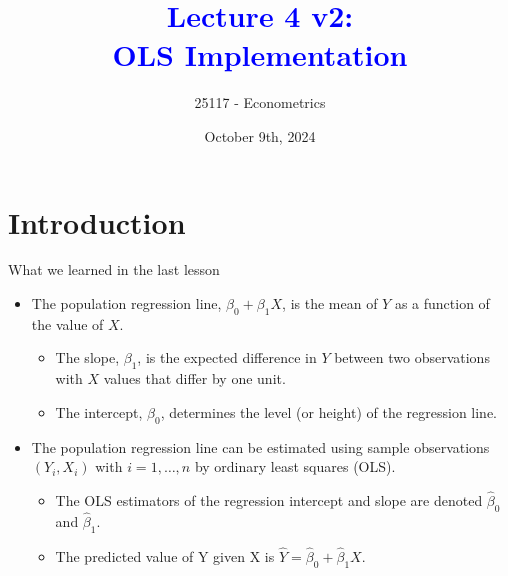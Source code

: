 \documentclass[notes,10pt, aspectratio=169]{beamer}
\title[]{\textcolor{blue}{Lecture 4 v2:\\OLS Implementation}}
\author{25117 - Econometrics}
\institute[shortinst]{Universitat Pompeu Fabra}
\date{October 9th, 2024}
\begin{document}

\begin{frame}[plain]
\maketitle
\end{frame}

\section{Introduction}

\begin{frame}{What we learned in the last lesson}
\begin{itemize}
    \item The population regression line, $\beta_0 + \beta_1 X$, is the mean of $Y$ as a function of the value of $X$.
    \begin{itemize}
        \item The slope, $\beta_1$, is the expected difference in $Y$ between two observations with $X$ values that differ by one unit.
        \item The intercept, $\beta_0$, determines the level (or height) of the regression line.
    \end{itemize}\vspace{1em}
    \item The population regression line can be estimated using sample observations $(Y_i, X_i)$ with $i = 1, \dots, n$ by ordinary least squares (OLS).
    \begin{itemize}
        \item The OLS estimators of the regression intercept and slope are denoted $\hat{\beta}_0$ and $\hat{\beta}_1$.
        \item The predicted value of Y given X is $\hat{Y}=\hat{\beta}_0 + \hat{\beta}_1 X$.
    \end{itemize}\vspace{1em}
\end{itemize}
\end{frame}
\end{document}
